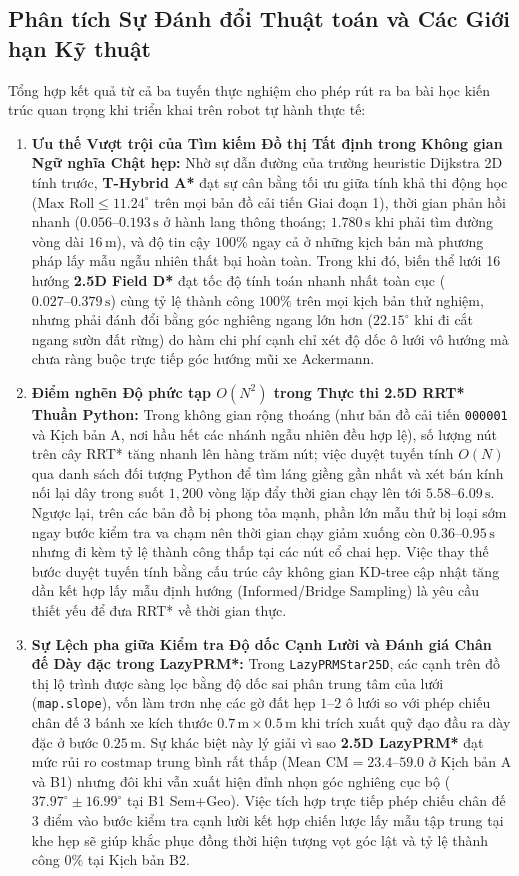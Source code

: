 \documentclass[a4paper,fleqn]{cas-sc}
\begin{document}
\subsection{Phân tích Sự Đánh đổi Thuật toán và Các Giới hạn Kỹ thuật}
\label{subsec:discussion}
Tổng hợp kết quả từ cả ba tuyến thực nghiệm cho phép rút ra ba bài học kiến trúc quan trọng khi triển khai trên robot tự hành thực tế:
\begin{enumerate}
    \item \textbf{Ưu thế Vượt trội của Tìm kiếm Đồ thị Tất định trong Không gian Ngữ nghĩa Chật hẹp:} Nhờ sự dẫn đường của trường heuristic Dijkstra 2D tính trước, \textbf{T-Hybrid A*} đạt sự cân bằng tối ưu giữa tính khả thi động học ($\text{Max Roll} \le 11.24^\circ$ trên mọi bản đồ cải tiến Giai đoạn 1), thời gian phản hồi nhanh ($0.056\text{--}0.193\,\text{s}$ ở hành lang thông thoáng; $1.780\,\text{s}$ khi phải tìm đường vòng dài $16\,\text{m}$), và độ tin cậy $100\%$ ngay cả ở những kịch bản mà phương pháp lấy mẫu ngẫu nhiên thất bại hoàn toàn. Trong khi đó, biến thể lưới 16 hướng \textbf{2.5D Field D*} đạt tốc độ tính toán nhanh nhất toàn cục ($0.027\text{--}0.379\,\text{s}$) cùng tỷ lệ thành công $100\%$ trên mọi kịch bản thử nghiệm, nhưng phải đánh đổi bằng góc nghiêng ngang lớn hơn ($22.15^\circ$ khi đi cắt ngang sườn đất rừng) do hàm chi phí cạnh chỉ xét độ dốc ô lưới vô hướng mà chưa ràng buộc trực tiếp góc hướng mũi xe Ackermann.
    \item \textbf{Điểm nghẽn Độ phức tạp $O(N^2)$ trong Thực thi 2.5D RRT* Thuần Python:} Trong không gian rộng thoáng (như bản đồ cải tiến \texttt{000001} và Kịch bản A, nơi hầu hết các nhánh ngẫu nhiên đều hợp lệ), số lượng nút trên cây RRT* tăng nhanh lên hàng trăm nút; việc duyệt tuyến tính $O(N)$ qua danh sách đối tượng Python để tìm láng giềng gần nhất và xét bán kính nối lại dây trong suốt $1{,}200$ vòng lặp đẩy thời gian chạy lên tới $5.58\text{--}6.09\,\text{s}$. Ngược lại, trên các bản đồ bị phong tỏa mạnh, phần lớn mẫu thử bị loại sớm ngay bước kiểm tra va chạm nên thời gian chạy giảm xuống còn $0.36\text{--}0.95\,\text{s}$ nhưng đi kèm tỷ lệ thành công thấp tại các nút cổ chai hẹp. Việc thay thế bước duyệt tuyến tính bằng cấu trúc cây không gian KD-tree cập nhật tăng dần kết hợp lấy mẫu định hướng (Informed/Bridge Sampling) là yêu cầu thiết yếu để đưa RRT* về thời gian thực.
    \item \textbf{Sự Lệch pha giữa Kiểm tra Độ dốc Cạnh Lười và Đánh giá Chân đế Dày đặc trong LazyPRM*:} Trong \texttt{LazyPRMStar25D}, các cạnh trên đồ thị lộ trình được sàng lọc bằng độ dốc sai phân trung tâm của lưới (\texttt{map.slope}), vốn làm trơn nhẹ các gờ đất hẹp $1\text{--}2$ ô lưới so với phép chiếu chân đế 3 bánh xe kích thước $0.7\,\text{m} \times 0.5\,\text{m}$ khi trích xuất quỹ đạo đầu ra dày đặc ở bước $0.25\,\text{m}$. Sự khác biệt này lý giải vì sao \textbf{2.5D LazyPRM*} đạt mức rủi ro costmap trung bình rất thấp ($\text{Mean CM} = 23.4\text{--}59.0$ ở Kịch bản A và B1) nhưng đôi khi vẫn xuất hiện đỉnh nhọn góc nghiêng cục bộ ($37.97^\circ \pm 16.99^\circ$ tại B1 Sem+Geo). Việc tích hợp trực tiếp phép chiếu chân đế 3 điểm vào bước kiểm tra cạnh lười kết hợp chiến lược lấy mẫu tập trung tại khe hẹp sẽ giúp khắc phục đồng thời hiện tượng vọt góc lật và tỷ lệ thành công $0\%$ tại Kịch bản B2.

\end{enumerate}
\end{document}
